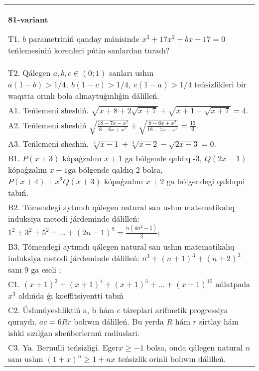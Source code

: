 \documentclass{article}
\begin{document}
\begin{tabular}{m{17cm}}
\textbf{81-variant}
\newline

T1. \(b\) parametriniń qanday mánisinde \(x^{3} + 17x^{2} + bx - 17 = 0\) teńlemesiniń korenleri pútin sanlardan turadı? \\
T2. Qálegen \(a,b,c \in (0;1)\) sanları ushın \(a(1 - b) > 1/4,\ b(1 - c) > 1/4,\ c(1 - a) > 1/4\) teńsizlikleri bir waqıtta orınlı bola almaytuǵınlıǵin dálilleń. \\
A1. Teńlemeni sheshiń. \(\sqrt{x + 8 + 2\sqrt{x + 7}} + \sqrt{x + 1 - \sqrt{x + 7}} = 4\). \\
A2. Teńlemeni sheshiń \(\sqrt{\frac{18 - 7x - x^{2}}{8 - 6x + x^{2}}} + \sqrt{\frac{8 - 6x + x^{2}}{18 - 7x - x^{2}}} = \frac{13}{6}\). \\
A3. Teńlemeni sheshiń. \(\sqrt[3]{x - 1} + \sqrt[3]{x - 2} - \sqrt{2x - 3} = 0\). \\
B1. \(P(x + 3)\) kópaǵzalını \(x + 1\) ga bólgende qaldıq -3, \(Q(2x - 1)\) kópaǵzalını \(x - 1\)ga bólgende qaldıq 2 bolsa, \(P(x + 4) + x^{2}Q(x + 3)\) kópaǵzalını \(x + 2\) ga bólgendegi qaldıqni tabıń. \\
B2. Tómendegi aytımdı qálegen natural san ushın matematikalıq induksiya metodi járdeminde dálilleń: \(1^{2} + 3^{2} + 5^{2} + ... + (2n - 1)^{2} = \frac{n\left( 4n^{2} - 1 \right)}{3}\); \\
B3. Tómendegi aytımdı qálegen natural san ushın matematikalıq induksiya metodi járdeminde dálilleń: \(n^{3} + (n + 1)^{3} + (n + 2)^{3}\) sanı 9 ga eseli ; \\
C1. \((x + 1)^{3} + (x + 1)^{4} + (x + 1)^{5} + ... + (x + 1)^{10}\) ańlatpada \(x^{3}\) aldıńda ǵı koeffitsiyentti tabıń \\
C2. Úshmúyeshliktiń a, b hám \(c\) táreplari arifmetik progressiya quraydı. \(ac = 6Rr\) bolıwın dálilleń. Bu yerda \(R\) hám \(r\) sirtlay hám ishki sızılǵan sheńberlernıń radiuslari. \\
C3. Ya. Bernulli teńsizligi. Eger\(x \geq - 1\) bolsa, onda qálegen natural \(n\) sanı ushın \((1 + x)^{n} \geq 1 + nx\) teńsizlik orinli bolıwın dálilleń. \\

\end{tabular}
\vspace{1cm}
\end{document}
